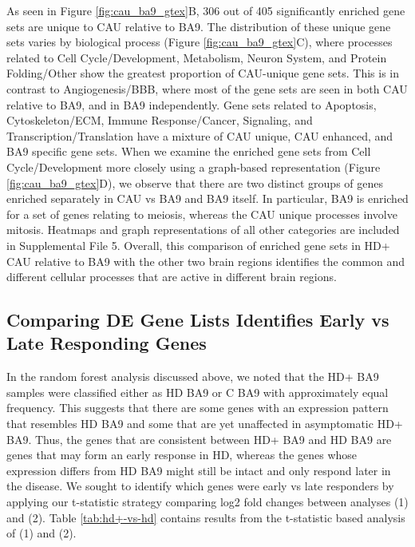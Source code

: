 \documentclass[fleqn,10pt,table]{wlscirep}
\begin{document}
As seen in Figure \ref{fig:cau_ba9_gtex}B, 306 out of 405 significantly enriched gene sets are unique to CAU relative to BA9.
The distribution of these unique gene sets varies by biological process (Figure \ref{fig:cau_ba9_gtex}C), where processes related to Cell Cycle/Development, Metabolism, Neuron System, and Protein Folding/Other show the greatest proportion of CAU-unique gene sets.
This is in contrast to Angiogenesis/BBB, where most of the gene sets are seen in both CAU relative to BA9, and in BA9 independently.
Gene sets related to Apoptosis, Cytoskeleton/ECM, Immune Response/Cancer, Signaling, and Transcription/Translation have a mixture of CAU unique, CAU enhanced, and BA9 specific gene sets.
When we examine the enriched gene sets from Cell Cycle/Development more closely using a graph-based representation (Figure \ref{fig:cau_ba9_gtex}D), we observe that there are two distinct groups of genes enriched separately in CAU vs BA9 and BA9 itself.
In particular, BA9 is enriched for a set of genes relating to meiosis, whereas the CAU unique processes involve mitosis.
Heatmaps and graph representations of all other categories are included in Supplemental File 5.
Overall, this comparison of enriched gene sets in HD+ CAU relative to BA9 with the other two brain regions identifies the common and different cellular processes that are active in different brain regions.

\subsection{Comparing DE Gene Lists Identifies Early vs Late Responding Genes}

In the random forest analysis discussed above, we noted that the HD+ BA9 samples were classified either as HD BA9 or C BA9 with approximately equal frequency.
This suggests that there are some genes with an expression pattern that resembles HD BA9 and some that are yet unaffected in asymptomatic HD+ BA9.
Thus, the genes that are consistent between HD+ BA9 and HD BA9 are genes that may form an early response in HD, whereas the genes whose expression differs from HD BA9 might still be intact and only respond later in the disease.
We sought to identify which genes were early vs late responders by applying our t-statistic strategy comparing log2 fold changes between analyses (1) and (2).
Table \ref{tab:hd+-vs-hd} contains results from the t-statistic based analysis of (1) and (2).
\end{document}
